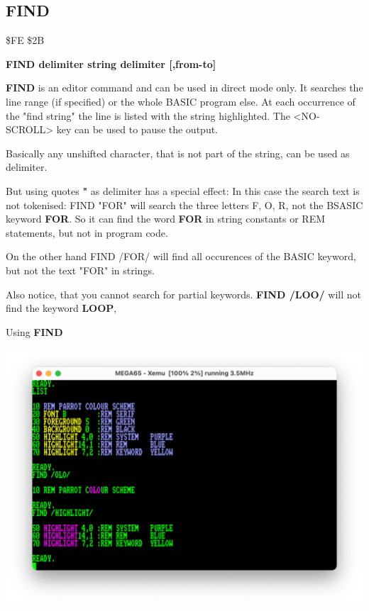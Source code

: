 \subsection{FIND}
\begin{description}[leftmargin=2cm,style=nextline]
\item [Token:] \$FE \$2B
\item [Format:] {\bf FIND {\bf delimiter} string {\bf delimiter} [,from-to]}
\item [Usage:]  {\bf FIND} is an editor command and can be used
                in direct mode only. It searches the line range
                (if specified) or the whole BASIC program else.
                At each occurrence of the "find string" the line is
                listed with the string highlighted.
                The <NO-SCROLL> key can be used to pause the output.

\item [Remarks:] Basically any unshifted character, that is not part of
                 the string, can be used as delimiter.

                 But using quotes {\bf "} as delimiter has a special effect:
                 In this case the search text is not tokenised:
                 FIND "FOR" will search the three letters F, O, R, not
                 the BSASIC keyword {\bf FOR}. So it can find the word
                 {\bf FOR} in string constants or REM statements, but not
                 in program code.

                 On the other hand FIND /FOR/ will find all occurences of
                 the BASIC keyword, but not the text "FOR" in strings.

                 Also notice, that you cannot search for partial keywords.
                 {\bf FIND /LOO/} will not find the keyword {\bf LOOP},


\item [Example:] Using {\bf FIND}
\end{description}
\begin{center}
\includegraphics[width=0.8\linewidth]{images/highlight.png}
\end{center}

